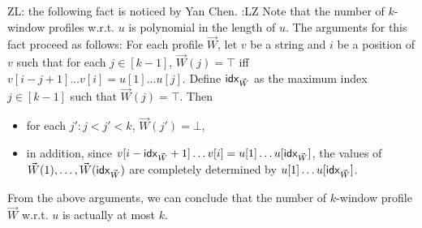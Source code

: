 \documentclass{llncs}
\newcommand{\zhilin}[1]{\color{cyan} {ZL: #1 :LZ} \color{black}}
\begin{document}
\zhilin{the following fact is noticed by Yan Chen.} 
Note that the number of $k$-window profiles w.r.t. $u$ is polynomial in the length of $u$. The arguments for this fact proceed as follows: For each profile $\vec{W}$, let $v$ be a string and $i$ be a position of $v$ such that for each $j \in [k-1]$, $\vec{W}(j) = \top$ iff $v[i-j+1] \dots v[i] = u[1] \dots u[j]$. Define ${\sf idx}_{\vec{W}}$ as the maximum index $j \in [k-1]$ such that $\vec{W}(j)=\top$. Then 
\begin{itemize}
\item for each $j': j < j' < k$, $\vec{W}(j')=\bot$, 
\item in addition, since $v[i-{\sf idx}_{\vec{W}}+1] \dots v[i] = u[1] \dots u[{\sf idx}_{\vec{W}}]$, the values of $\vec{W}(1),\dots, \vec{W}({\sf idx}_{\vec{W}})$ are completely determined by $u[1] \dots u[{\sf idx}_{\vec{W}}]$.
\end{itemize}
From the above arguments, we can  conclude that the number of $k$-window profile $\vec{W}$ w.r.t. $u$ is actually at most $k$.

\smallskip
\end{document}
